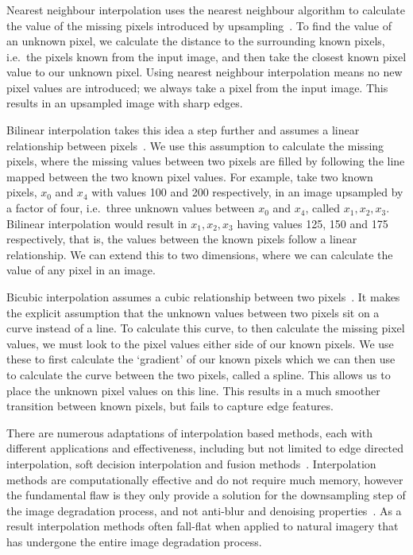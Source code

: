 \subsubsection{}
Nearest neighbour interpolation uses the nearest neighbour algorithm to calculate the value of the missing pixels introduced by upsampling~\cite{nnInterpolation}. To find the value of an unknown pixel, we calculate the distance to the surrounding known pixels, i.e.\ the pixels known from the input image, and then take the closest known pixel value to our unknown pixel. Using nearest neighbour interpolation means no new pixel values are introduced; we always take a pixel from the input image. This results in an upsampled image with sharp edges.

Bilinear interpolation takes this idea a step further and assumes a linear relationship between pixels~\cite{bilnearInterpolation}. We use this assumption to calculate the missing pixels, where the missing values between two pixels are filled by following the line mapped between the two known pixel values. For example, take two known pixels, $x_0$ and $x_4$ with values 100 and 200 respectively, in an image upsampled by a factor of four, i.e.\ three unknown values between $x_0$ and $x_4$, called $x_1, x_2, x_3$. Bilinear interpolation would result in $x_1, x_2, x_3$ having values 125, 150 and 175 respectively, that is, the values between the known pixels follow a linear relationship. We can extend this to two dimensions, where we can calculate the value of any pixel in an image.

Bicubic interpolation assumes a cubic relationship between two pixels~\cite{bicubicInterpolation}. It makes the explicit assumption that the unknown values between two pixels sit on a curve instead of a line. To calculate this curve, to then calculate the missing pixel values, we must look to the pixel values either side of our known pixels. We use these to first calculate the `gradient' of our known pixels which we can then use to calculate the curve between the two pixels, called a spline. This allows us to place the unknown pixel values on this line. This results in a much smoother transition between known pixels, but fails to capture edge features.

There are numerous adaptations of interpolation based methods, each with different applications and effectiveness, including but not limited to edge directed interpolation, soft decision interpolation and fusion methods~\cite{interpolation}. Interpolation methods are computationally effective and do not require much memory, however the fundamental flaw is they only provide a solution for the downsampling step of the image degradation process, and not anti-blur and denoising properties~\cite{interpolation}. As a result interpolation methods often fall-flat when applied to natural imagery that has undergone the entire image degradation process.

